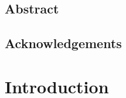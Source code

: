 








\section*{Abstract}


\newpage
\section*{Acknowledgements}

\clearpage

\setcounter{page}{1}
\tableofcontents

\chapter{Introduction}


